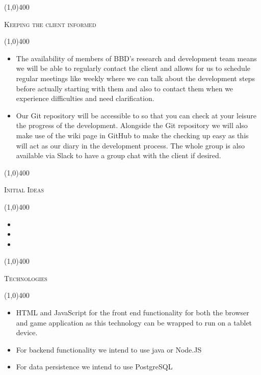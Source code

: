\documentclass[12pt,a4paper]{report}
\begin{document}
\begin{center}
	
	\line(1,0){400}\\
	{\scshape\large Keeping the client informed \par}
	\line(1,0){400}\\
	\end{center}
		\begin{itemize}
\item The availability of members of BBD's research and development team means we will be able to regularly contact the client and allows for us to schedule regular meetings like weekly where we can talk about the development steps before actually starting with them and also to contact them when we experience difficulties and need clarification.
\item Our Git repository will be accessible to so that you can check
at your leisure the progress of the development. Alongside the Git
repository we will also make use of the wiki page in GitHub to make
the checking up easy as this will act as our diary in the development
process. The whole group is also available via Slack to have a group
chat with the client if desired.
\end{itemize}

\begin{center}
	
	\line(1,0){400}\\
	{\scshape\large Initial Ideas \par}
	\line(1,0){400}\\
	\end{center}
		\begin{itemize}
\item 
\item 
\item
\end{itemize}
\begin{center}
	
	\line(1,0){400}\\
	{\scshape\large Technologies \par}
	\line(1,0){400}\\
	\end{center}
		\begin{itemize}
\item HTML and JavaScript for the front end functionality for both the browser and game application as this technology can be wrapped to run on a tablet device.
\item For backend functionality we intend to use java or Node.JS
\item For data persistence we intend to use PostgreSQL
\end{itemize}
\newpage
\end{document}
